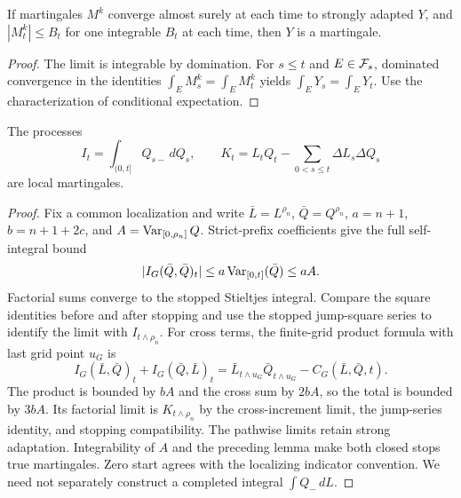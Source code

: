 \begin{lemma}
If martingales $M^k$ converge almost surely at each time to strongly adapted
$Y$, and $|M^k_t|\leq B_t$ for one integrable $B_t$ at each time, then $Y$
is a martingale.
\end{lemma}
\begin{proof}
The limit is integrable by domination. For $s\leq t$ and $E\in\mathcal F_s$,
dominated convergence in the identities $\int_E M^k_s=\int_E M^k_t$ yields
$\int_EY_s=\int_EY_t$. Use the characterization of conditional expectation.
\end{proof}
\begin{lemma}
The processes
\[
 I_t=\int_{(0,t]}Q_{s-}\,dQ_s,\qquad
 K_t=L_tQ_t-\sum_{0<s\leq t}\Delta L_s\Delta Q_s
\]
are local martingales.
\end{lemma}
\begin{proof}
Fix a common localization and write $\bar L=L^{\rho_n}$, $\bar Q=Q^{\rho_n}$,
$a=n+1$, $b=n+1+2c$, and $A=\operatorname{Var}_{[0,\rho_n]}Q$.
Strict-prefix coefficients give the full self-integral bound
\[
 |I_G(\bar Q,\bar Q)_t|\leq a\operatorname{Var}_{[0,t]}(\bar Q)\leq aA.
\] Factorial sums converge to the stopped
Stieltjes integral. Compare the square identities before and after stopping
and use the stopped jump-square series to identify the limit with $I_{t\wedge\rho_n}$.
For cross terms, the finite-grid product formula with last grid point $u_G$ is
\[
 I_G(\bar L,\bar Q)_t+I_G(\bar Q,\bar L)_t
 =\bar L_{t\wedge u_G}\bar Q_{t\wedge u_G}-C_G(\bar L,\bar Q,t).
\]
The product is bounded by $bA$ and the cross sum by $2bA$, so the total is
bounded by $3bA$. Its factorial limit is $K_{t\wedge\rho_n}$ by the
cross-increment limit, the jump-series identity, and stopping compatibility.
The pathwise limits retain strong adaptation. Integrability of $A$ and the
preceding lemma make both closed stops true martingales. Zero start agrees
with the localizing indicator convention. We need not separately construct
a completed integral $\int Q_-\,dL$.
\end{proof}

